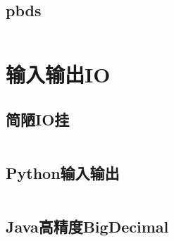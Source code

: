 \documentclass[twoside,sub3section,UTF8]{ctexart}						%
\begin{document}
	\subsection{pbds}
	\inputminted{c++}{"Other/pbds.cpp"}

\newpage
\section{输入输出IO}
	\subsection{简陋IO挂}
	\inputminted{c++}{"IO/IO.cpp"}
	\subsection{Python输入输出}
	\inputminted{python}{"IO/IO.py"}
	\subsection{Java高精度BigDecimal}
	\inputminted{java}{"IO/IO.java"}
\end{document}
